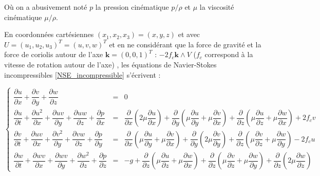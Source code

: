 \documentclass[10pt,a4paper]{amsart}
\begin{document}
Où on a abusivement noté $p$ la pression cinématique $p / \rho$ et $\mu$ la viscosité cinématique $\mu / \rho$.

En coordonnées cartésiennes $(x_1, x_2, x_3) = (x,y,z)$ et avec $U = (u_1, u_2, u_3)^{T} = (u, v, w)^{T}$ et en ne considérant que la force de gravité et la force de coriolis autour de l'axe $\mathbf{k} = (0, 0, 1)^T$ : $-2 f_c \mathbf{k} \wedge V$ ($f_c$ correspond à la vitesse de rotation autour de l'axe) , les équations de Navier-Stokes incompressibles \eqref{NSE_incompressible} s'écrivent :


\begin{equation}\label{NSE_incompressible_cartesien}
\left\{
\begin{array}{rcl}
\dfrac{\partial u}{\partial x} + \dfrac{\partial v}{\partial y}+\dfrac{\partial w}{\partial z}&=&0\\

\dfrac{\partial u}{\partial t} +  \dfrac{\partial u^2}{\partial x} + \dfrac{\partial u v}{\partial y} + \dfrac{\partial u w}{\partial z} + \dfrac{\partial p}{\partial x} & = & \dfrac{\partial}{\partial x}\left( 2 \mu \dfrac{\partial u}{\partial x} \right) + \dfrac{\partial}{\partial y}\left(\mu \dfrac{\partial u}{\partial y} + \mu \dfrac{\partial v}{\partial x}\right) + \dfrac{\partial}{\partial z}\left(\mu \dfrac{\partial u}{\partial z} + \mu \dfrac{\partial w}{\partial x}\right)+2 f_c v\\

\dfrac{\partial v}{\partial t} +  \dfrac{\partial uv}{\partial x} + \dfrac{\partial v^2}{\partial y} + \dfrac{\partial v w}{\partial z} + \dfrac{\partial p}{\partial y} & = &  \dfrac{\partial}{\partial x}\left(\mu \dfrac{\partial u}{\partial y} + \mu \dfrac{\partial v}{\partial x}\right) + \dfrac{\partial}{\partial y}\left( 2 \mu \dfrac{\partial v}{\partial y} \right) + \dfrac{\partial}{\partial z}\left(\mu \dfrac{\partial v}{\partial z} + \mu \dfrac{\partial w}{\partial y}\right)-2 f_c u\\

\dfrac{\partial w}{\partial t} +  \dfrac{\partial wv}{\partial x} + \dfrac{\partial wv}{\partial y} + \dfrac{\partial w^2}{\partial z} + \dfrac{\partial p}{\partial z} & = & -g + \dfrac{\partial}{\partial z}\left(\mu \dfrac{\partial u}{\partial z} + \mu \dfrac{\partial w}{\partial x}\right) + \dfrac{\partial}{\partial z}\left(\mu \dfrac{\partial v}{\partial z} + \mu \dfrac{\partial w}{\partial y}\right) + \dfrac{\partial}{\partial z}\left( 2 \mu \dfrac{\partial w}{\partial z} \right)
\end{array}
\right.
\end{equation}
\end{document}
